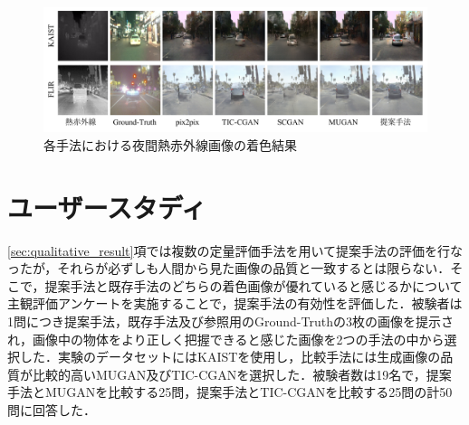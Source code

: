 \documentclass[11pt,dvipdfmx]{ujreport}
\begin{document}
\begin{figure}[tb]
    \centering
    \includegraphics[clip, width=1\columnwidth]{images/qualitative_night-jp_20240114.pdf}
    \caption{各手法における夜間熱赤外線画像の着色結果}
    \label{fig:qualitative_night}
\end{figure}


\section{ユーザースタディ}
\ref{sec:qualitative_result}項では複数の定量評価手法を用いて提案手法の評価を行なったが，それらが必ずしも人間から見た画像の品質と一致するとは限らない．そこで，提案手法と既存手法のどちらの着色画像が優れていると感じるかについて主観評価アンケートを実施することで，提案手法の有効性を評価した．被験者は1問につき提案手法，既存手法及び参照用のGround-Truthの3枚の画像を提示され，画像中の物体をより正しく把握できると感じた画像を2つの手法の中から選択した．実験のデータセットにはKAISTを使用し，比較手法には生成画像の品質が比較的高いMUGAN及びTIC-CGANを選択した．被験者数は19名で，提案手法とMUGANを比較する25問，提案手法とTIC-CGANを比較する25問の計50問に回答した．

\begin{table}[tb]
\centering
\caption{主観評価アンケートの集計結果}
\label{tab:user_study}
\end{table}
\end{document}
